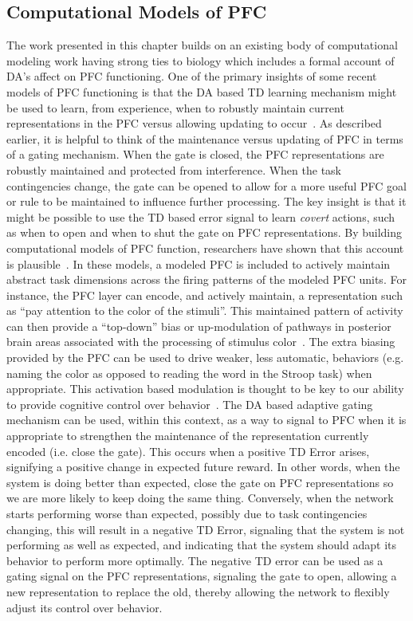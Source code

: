 \subsection{Computational Models of PFC}
The work presented in this chapter builds on an existing body of computational modeling work having strong ties to biology which includes a formal account of DA's affect on PFC functioning.  One of the primary insights of some recent models of PFC functioning is that the DA based TD learning mechanism might be used to learn, from experience, when to robustly maintain current representations in the PFC versus allowing updating to occur~\cite{BraverTS:2000:Control}.  As described earlier, it is helpful to think of the maintenance versus updating of PFC in terms of a gating mechanism.  When the gate is closed, the PFC representations are robustly maintained and protected from interference.  When the task contingencies change, the gate can be opened to allow for a more useful PFC goal or rule to be maintained to influence further processing. The key insight is that it might be possible to use the TD based error signal to learn \emph{covert} actions, such as when to open and when to shut the gate on PFC representations. By building computational models of PFC function, researchers have shown that this account is plausible~\cite{BraverTS:2000:Control,OReillyRC:2002:IDED}. In these models, a modeled PFC is included to actively maintain abstract task dimensions across the firing patterns of the modeled PFC units.  For instance, the PFC layer can encode, and actively maintain, a representation such as ``pay attention to the color of the stimuli''.  This maintained pattern of activity can then provide a ``top-down'' bias or up-modulation of pathways in posterior brain areas associated with the processing of stimulus color~\cite{CohenJD:1990:Stroop}.  The extra biasing provided by the PFC can be used to drive weaker, less automatic, behaviors (e.g. naming the color as opposed to reading the word in the Stroop task) when appropriate.  This activation based modulation is thought to be key to our ability to provide cognitive control over behavior~\cite{CohenJD:1992:Schizophrenia}.  The DA based adaptive gating mechanism can be used, within this context, as a way to signal to PFC when it is appropriate to strengthen the maintenance of the representation currently encoded (i.e. close the gate).  This occurs when a positive TD Error arises, signifying a positive change in expected future reward.  In other words, when the system is doing better than expected, close the gate on PFC representations so we are more likely to keep doing the same thing.  Conversely, when the network starts performing worse than expected, possibly due to task contingencies changing, this will result in a negative TD Error, signaling that the system is not performing as well as expected, and indicating that the system should adapt its behavior to perform more optimally.  The negative TD error can be used as a gating signal on the PFC representations, signaling the gate to open, allowing a new representation to replace the old, thereby allowing the network to flexibly adjust its control over behavior.


